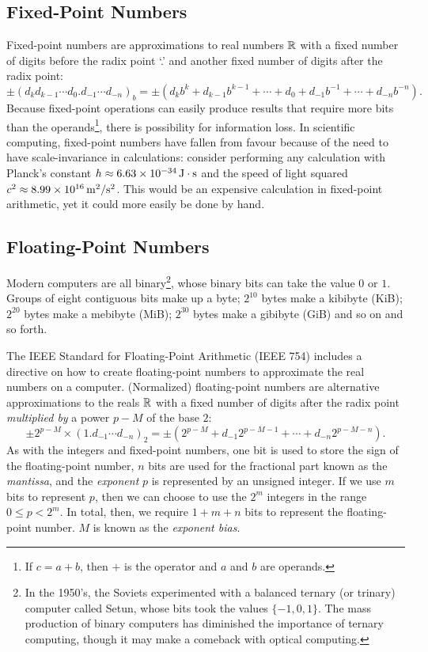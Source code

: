 \subsection{Fixed-Point Numbers}

Fixed-point numbers are approximations to real numbers $\mathbb{R}$ with a fixed number of digits before the radix point `.' and another fixed number of digits after the radix point:
\[
\pm(d_kd_{k-1}\cdots d_0.d_{-1}\cdots d_{-n})_b = \pm\left(d_kb^k + d_{k-1}b^{k-1} + \cdots + d_0 + d_{-1}b^{-1} + \cdots + d_{-n}b^{-n}\right).
\]
Because fixed-point operations can easily produce results that require more bits than the operands\footnote{If $c = a+b$, then $+$ is the operator and $a$ and $b$ are operands.}, there is possibility for information loss. In scientific computing, fixed-point numbers have fallen from favour because of the need to have scale-invariance in calculations: consider performing any calculation with Planck's constant $h \approx 6.63\times10^{-34}{\rm\,J}\cdot{\rm s}$ and the speed of light squared $c^2 \approx 8.99\times10^{16}{\rm\,m}^2/{\rm s}^2$. This would be an expensive calculation in fixed-point arithmetic, yet it could more easily be done by hand.

\subsection{Floating-Point Numbers}

Modern computers are all binary\footnote{In the 1950's, the Soviets experimented with a balanced ternary (or trinary) computer called Setun, whose bits took the values $\{-1,0,1\}$. The mass production of binary computers has diminished the importance of ternary computing, though it may make a comeback with optical computing.}, whose binary bits can take the value $0$ or $1$. Groups of eight contiguous bits make up a byte; $2^{10}$ bytes make a kibibyte (KiB); $2^{20}$ bytes make a mebibyte (MiB); $2^{30}$ bytes make a gibibyte (GiB) and so on and so forth.

The IEEE Standard for Floating-Point Arithmetic (IEEE 754) includes a directive on how to create floating-point numbers to approximate the real numbers on a computer. (Normalized) floating-point numbers are alternative approximations to the reals $\mathbb{R}$ with a fixed number of digits after the radix point {\em multiplied by} a power $p-M$ of the base $2$:
\[
\pm 2^{p-M} \times (1.d_{-1}\cdots d_{-n})_2  = \pm\left(2^{p-M} + d_{-1}2^{p-M-1} + \cdots + d_{-n}2^{p-M-n}\right).
\]
As with the integers and fixed-point numbers, one bit is used to store the sign of the floating-point number, $n$ bits are used for the fractional part known as the {\em mantissa}, and the {\em exponent} $p$ is represented by an unsigned integer. If we use $m$ bits to represent $p$, then we can choose to use the $2^m$ integers in the range $0 \le p < 2^m$. In total, then, we require $1+m+n$ bits to represent the floating-point number. $M$ is known as the {\em exponent bias}.

